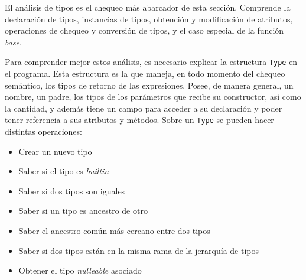 \documentclass{llncs}
\begin{document}
El análisis de tipos es el chequeo más abarcador de esta sección. Comprende la declaración de tipos, instancias de tipos, obtención y modificación de atributos, operaciones de chequeo y conversión de tipos, y el caso especial de la función \textit{base}.

Para comprender mejor estos análisis, es necesario explicar la estructura \texttt{Type} en el programa. Esta estructura es la que maneja, en todo momento del chequeo semántico, los tipos de retorno de las expresiones. Posee, de manera general, 
un nombre, un padre, los tipos de los parámetros que recibe su constructor, así como la cantidad, y además tiene un campo para acceder a su declaración y poder tener referencia a sus atributos y métodos. Sobre un \texttt{Type} se pueden hacer distintas 
operaciones: 
\begin{itemize}
    \item Crear un nuevo tipo
    \item Saber si el tipo es \textit{builtin}
    \item Saber si dos tipos son iguales
    \item Saber si un tipo es ancestro de otro
    \item Saber el ancestro común más cercano entre dos tipos 
    \item Saber si dos tipos están en la misma rama de la jerarquía de tipos 
    \item Obtener el tipo \textit{nulleable} asociado
\end{itemize}
\end{document}

